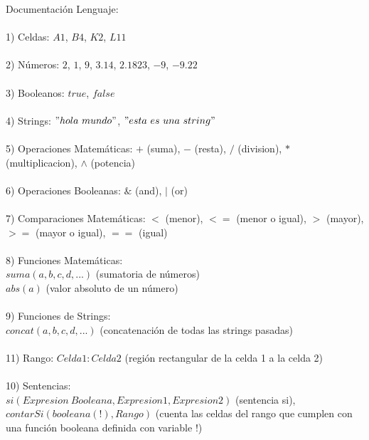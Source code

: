 \documentclass[10pt,a4paper]{report}
\begin{document}
 
Documentaci\'on Lenguaje: \\\\
1) Celdas: $A1$, $B4$, $K2$, $L11$ \\\\
2) N\'umeros: $2$, $1$, $9$, $3.14$, $2.1823$, $-9$, $-9.22$\\\\
3) Booleanos: $true$, $false$ \\\\
4) Strings: $"hola\ mundo"$, $"esta\ es\ una\ string"$ \\\\
5) Operaciones Matem\'aticas: $+$ (suma), $-$ (resta), $/$ (division), $*$ (multiplicacion), $\wedge$ (potencia) \\\\
6) Operaciones Booleanas: $\&$ (and), $|$ (or) \\\\
7) Comparaciones Matem\'aticas: $<$ (menor), $<=$ (menor o igual), $>$ (mayor), $>=$ (mayor o igual), $==$ (igual) \\\\
8) Funciones Matem\'aticas: \\
 $suma(a,b,c,d,...)$ (sumatoria de n\'umeros) \\
 $abs(a)$ (valor absoluto de un n\'umero) \\\\
9) Funciones de Strings: \\
  $concat(a,b,c,d,...)$ (concatenaci\'on de todas las strings pasadas) \\\\
11) Rango: $Celda1:Celda2$ (regi\'on rectangular de la celda 1 a la celda 2) \\\\
10) Sentencias:\\ $si(Expresion\ Booleana,Expresion1,Expresion2)$ (sentencia si), \\ $contarSi(booleana(!),Rango)$ (cuenta las celdas del rango que cumplen con una funci\'on booleana definida con variable $!$)
\end{document}
